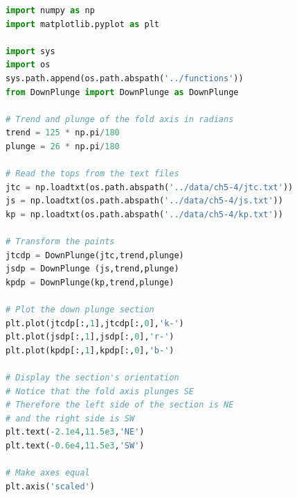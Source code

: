 \documentclass[a4paper , 12pt]{book}
\begin{document}
\begin{lstlisting}[language=Python, frame=single]
import numpy as np
import matplotlib.pyplot as plt

import sys
import os
sys.path.append(os.path.abspath('../functions'))
from DownPlunge import DownPlunge as DownPlunge

# Trend and plunge of the fold axis in radians
trend = 125 * np.pi/180
plunge = 26 * np.pi/180

# Read the tops from the text files
jtc = np.loadtxt(os.path.abspath('../data/ch5-4/jtc.txt'))
js = np.loadtxt(os.path.abspath('../data/ch5-4/js.txt'))
kp = np.loadtxt(os.path.abspath('../data/ch5-4/kp.txt'))

# Transform the points
jtcdp = DownPlunge(jtc,trend,plunge)
jsdp = DownPlunge (js,trend,plunge)
kpdp = DownPlunge(kp,trend,plunge)

# Plot the down plunge section
plt.plot(jtcdp[:,1],jtcdp[:,0],'k-')
plt.plot(jsdp[:,1],jsdp[:,0],'r-')
plt.plot(kpdp[:,1],kpdp[:,0],'b-')

# Display the section's orientation
# Notice that the fold axis plunges SE
# Therefore the left side of the section is NE
# and the right side is SW
plt.text(-2.1e4,11.5e3,'NE')
plt.text(-0.6e4,11.5e3,'SW')

# Make axes equal
plt.axis('scaled')
\end{lstlisting}
\end{document}
